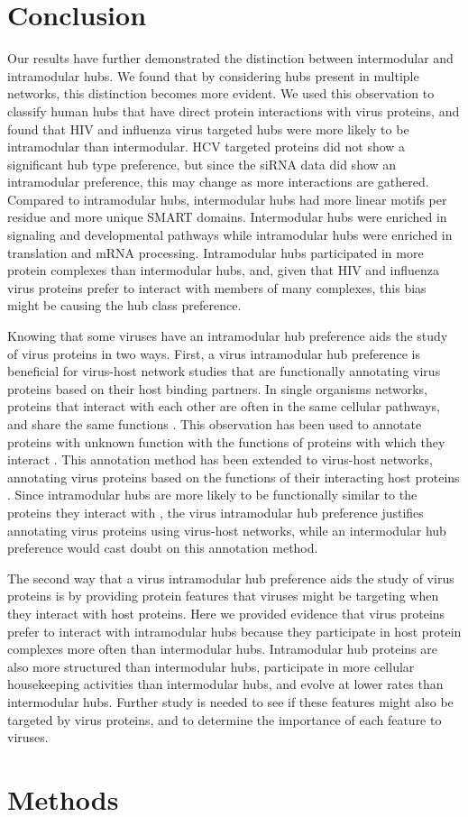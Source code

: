 \section{Conclusion}

Our results have further demonstrated the distinction between
intermodular and intramodular hubs. We found that by considering hubs
present in multiple networks, this distinction becomes more evident.
We used this observation to classify human hubs that have direct
protein interactions with virus proteins, and found that HIV and
influenza virus targeted hubs were more likely to be intramodular than
intermodular. HCV targeted proteins did not show a significant hub
type preference, but since the siRNA data did show an intramodular
preference, this may change as more interactions are
gathered. Compared to intramodular hubs, intermodular hubs had more
linear motifs per residue and more unique SMART domains. Intermodular
hubs were enriched in signaling and developmental pathways while
intramodular hubs were enriched in translation and mRNA
processing. Intramodular hubs participated in more protein complexes
than intermodular hubs, and, given that HIV and influenza virus
proteins prefer to interact with members of many complexes, this bias
might be causing the hub class preference.

Knowing that some viruses have an intramodular hub preference aids the
study of virus proteins in two ways. First, a virus intramodular hub
preference is beneficial for virus-host network studies that are
functionally annotating virus proteins based on their host binding
partners. In single organisms networks, proteins that interact with
each other are often in the same cellular pathways, and share the same
functions \cite{segal2003discovering}. This observation has been used
to annotate proteins with unknown function with the functions of
proteins with which they interact
\cite{karaoz2004whole,sharan2007network}. This annotation method has
been extended to virus-host networks, annotating virus proteins based
on the functions of their interacting host proteins
\cite{calderwood07}. Since intramodular hubs are more likely to be
functionally similar to the proteins they interact with
\cite{taylor09}, the virus intramodular hub preference justifies
annotating virus proteins using virus-host networks, while an
intermodular hub preference would cast doubt on this annotation
method.

The second way that a virus intramodular hub preference aids the study
of virus proteins is by providing protein features that viruses might
be targeting when they interact with host proteins. Here we provided
evidence that virus proteins prefer to interact with intramodular hubs
because they participate in host protein complexes more often than
intermodular hubs. Intramodular hub proteins are also more structured
than intermodular hubs, participate in more cellular housekeeping
activities than intermodular hubs, and evolve at lower rates than
intermodular hubs. Further study is needed to see if these features
might also be targeted by virus proteins, and to determine the
importance of each feature to viruses.

\section{Methods}

